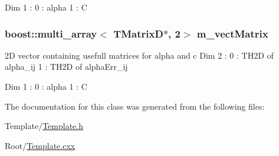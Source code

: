 Dim 1 \+: 0 \+: alpha 1 \+: C \hypertarget{classTemplateMethod_1_1Template_a3aa8dfbdcf19ebb9eab160327fe6f804}{
\subsubsection[{m\+\_\+vect\+Matrix}]{\setlength{\rightskip}{0pt plus 5cm}boost\+::multi\+\_\+array$<$ T\+Matrix\+D$\ast$, 2$>$ m\+\_\+vect\+Matrix\hspace{0.3cm}{\ttfamily [private]}}}\label{classTemplateMethod_1_1Template_a3aa8dfbdcf19ebb9eab160327fe6f804}


2\+D vector containing usefull matrices for alpha and c Dim 2 \+: 0 \+: T\+H2\+D of alpha\+\_\+ij 1 \+: T\+H2\+D of alpha\+Err\+\_\+ij 

Dim 1 \+: 0 \+: alpha 1 \+: C 

The documentation for this class was generated from the following files\+:\begin{DoxyCompactItemize}
\item 
Template/\hyperlink{Template_8h}{Template.\+h}\item 
Root/\hyperlink{Template_8cxx}{Template.\+cxx}\end{DoxyCompactItemize}
